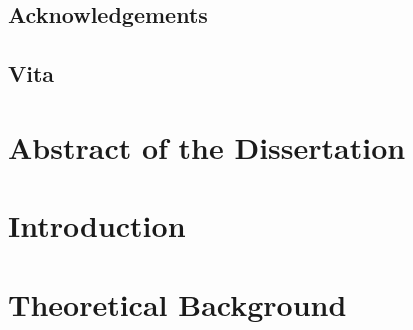 \documentclass[12pt]{ucsddissertation}
\theoremstyle{definition}
\theoremstyle{definition}
\theoremstyle{definition}
\numberwithin{equation}{section}
\begin{document}
{
\hypersetup{linkcolor=black}
\tableofcontents
\listoffigures
\listoftables
}

\setlength{\parskip}{0.6\baselineskip}


\ifdefined\HCode
    \chapter*{Acknowledgements}
    

    \chapter*{Vita}
    

    \part*{Abstract of the Dissertation}
    

    \mainmatter

    \part*{Introduction}
    
\else
    \begin{acknowledgements}
        
    \end{acknowledgements}

    \begin{vita}
        
    \end{vita}

    \begin{dissertationabstract}
        
    \end{dissertationabstract}

    \mainmatter

    \begin{dissertationintroduction}
        
    \end{dissertationintroduction}
\fi

\part{Theoretical Background}
\label{part:sm}


% 
% 
% 
\end{document}
